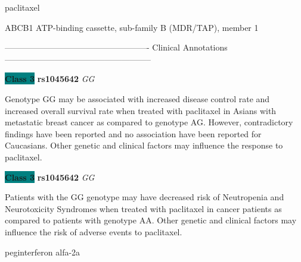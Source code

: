 \documentclass{resume} %
\begin{document}
\begin{rSection}{ paclitaxel }
\begin{rSubsection}{ ABCB1 }{ ATP-binding cassette, sub-family B (MDR/TAP), member 1 }{}{}
\item[] ---------------------------------------------------- Clinical Annotations -----------------------------------------------------\newline
\item \textbf{\colorbox{teal} {Class 3}} \textbf{ rs1045642 } \textit{ GG }
\item[] Genotype GG may be associated with increased disease control rate and increased overall survival rate when treated with paclitaxel in Asians with metastatic breast cancer as compared to genotype AG. However, contradictory findings have been reported and no association have been reported for Caucasians. Other genetic and clinical factors may influence the response to paclitaxel.\item \textbf{\colorbox{teal} {Class 3}} \textbf{ rs1045642 } \textit{ GG }
\item[] Patients with the GG genotype may have decreased risk of Neutropenia and Neurotoxicity Syndromes when treated with paclitaxel in cancer patients as compared to patients with genotype AA. Other genetic and clinical factors may influence the risk of adverse events to paclitaxel.
\end{rSubsection}

\end{rSection}\begin{rSection}{ peginterferon alfa-2a }
\item[]


\end{rSection}
\end{document}
